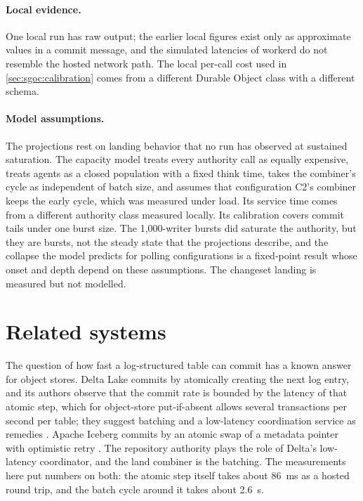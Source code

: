 \documentclass[11pt,letterpaper]{article}
\theoremstyle{definition}
\theoremstyle{remark}
\begin{document}
\paragraph{Local evidence.} One local run has raw output; the earlier local figures exist only as approximate values in a commit message, and the simulated latencies of workerd do not resemble the hosted network path. %
The local per-call cost used in \cref{sec:sgoc:calibration} comes from a different Durable Object class with a different schema. %

\paragraph{Model assumptions.} The projections rest on landing behavior that no run has observed at sustained saturation. The capacity model treats every authority call as equally expensive, treats agents as a closed population with a fixed think time, takes the combiner's cycle as independent of batch size, and assumes that configuration C2's combiner keeps the early cycle, which was measured under load. Its service time comes from a different authority class measured locally. Its calibration covers commit tails under one burst size. The 1,000-writer bursts did saturate the authority, but they are bursts, not the steady state that the projections describe, and the collapse the model predicts for polling configurations is a fixed-point result whose onset and depth depend on these assumptions. The changeset landing is measured but not modelled.

\section{Related systems}
\label{sec:sgoc:related}

The question of how fast a log-structured table can commit has a known answer for object stores. Delta Lake commits by atomically creating the next log entry, and its authors observe that the commit rate is bounded by the latency of that atomic step, which for object-store put-if-absent allows several transactions per second per table; they suggest batching and a low-latency coordination service as remedies \cite{armbrust2020delta}. Apache Iceberg commits by an atomic swap of a metadata pointer with optimistic retry \cite{icebergspec}. The repository authority plays the role of Delta's low-latency coordinator, and the land combiner is the batching. The measurements here put numbers on both: the atomic step itself takes about 86~ms as a hosted round trip, and the batch cycle around it takes about 2.6~s. %
\end{document}
